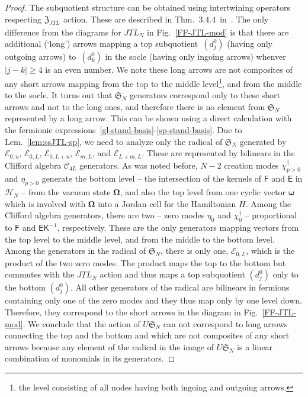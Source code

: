 \documentclass[11pt]{article}
\newcommand{\JTL}[1]{JTL_{#1}}
\newcommand{\K}{\mathsf{K}}
\newcommand{\F}{\mathsf{F}}
\newcommand{\E}{\mathsf{E}}
\newcommand{\Hilb}{\mathcal{H}}
\newcommand{\vac}{\boldsymbol{\Omega}}
\newcommand{\lvac}{\boldsymbol{\omega}}
\newcommand{\interLie}{\mathfrak{S}}
\newcommand{\interfin}[1]{\interLie_{#1}}
\newcommand{\Clif}[1]{\mathscr{C}_{#1}}
\newcommand{\Egl}{\mathcal{E}}
\newcommand{\cent}{\mathfrak{Z}}
\newcommand{\centJTL}{\cent_{\JTL{}}}
\newcommand{\IrrTL}[1]{(d^0_{#1})}
\theoremstyle{definition}
\begin{document}
\begin{proof}
\newcommand{\thmendoPPodd}{3.4.4~}
 The subquotient
structure can be obtained using intertwining operators respecting
$\centJTL$ action. These are described in Thm.~\thmendoPPodd in~\cite{GRS2}. The only
difference from the diagrams for $\JTL{N}$ in Fig.~\ref{FF-JTL-mod} is
that there are additional (`long') arrows mapping a top
subquotient~$\IrrTL{j}$ (having only outgoing arrows) to~$\IrrTL{k}$
in the socle (having only ingoing arrows) whenver $|j-k|\geq4$ is an
even number. We note these long arrows are not composites of any short
arrows mapping from the top to the middle level\footnote{the level  consisting of all nodes having  both ingoing and outgoing arrows.}, and from the middle
to the socle.
It turns out that $\interfin{N}$ generators correspond only to
these short arrows and not to the long ones, and therefore there is no
 element from $\interfin{N}$ represented by a long arrow. This can be
shown using a direct calculation with the fermionic expressions~\eqref{gl-stand-basis}-\eqref{sp-stand-basis}.
Due to  Lem.~\ref{lem:ssJTL-sp},  we need to analyze only the radical of $\interfin{N}$ generated by $\Egl_{0,n}$, $\Egl_{0,L}$, $\Egl_{0,L+n}$, $\Egl_{m,L}$, and
$\Egl_{L+m,L}$. These are represented by bilinears in the Clifford algebra $\Clif{4L}$ generators. As was noted before, $N-2$ creation modes
$\chi^{\dagger}_{p>0}$ and $\eta_{p>0}$ generate
the bottom level -- the intersection of the kernels of $\F$ and $\E$
in $\Hilb_N$ -- from the vacuum state $\vac$, and also the top level
from one cyclic vector $\lvac$ which is involved with $\vac$ into a
Jordan cell for the Hamiltonian $H$. Among the Clifford algebra generators, there are
two -- zero modes  $\eta_0$ and $\chi^{\dagger}_0$ -- proportional to
$\F$ and $\E\K^{-1}$, respectively. These are the only
generators mapping vectors from the top level to the middle level, and
from the middle to the bottom level. Among the generators  in the radical of $\interfin{N}$, there is only one, $\Egl_{0,L}$, which is the product of the two zero modes. The product maps the top
to the bottom but commutes
with the $\JTL{N}$ action
and   thus maps a top subquotient $\IrrTL{j}$ only to the bottom $\IrrTL{j}$.
 All other generators of the radical are bilinears in  fermions containing only
one of the zero modes and they thus map only by one level down. Therefore, they correspond to the short arrows in the diagram  in Fig.~\ref{FF-JTL-mod}.
We conclude that the action of $U\interfin{N}$ can
not correspond to  long arrows connecting the top and the bottom
and which are not composites of any short arrows because any element of the radical in the image of $U \interfin{N}$ is a linear combination of monomials in its generators.


\end{proof}
\end{document}
